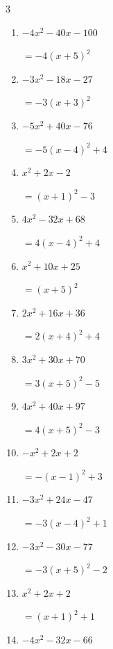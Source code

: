 \begin{multicols}{3}
\begin{enumerate}
\columnbreak %

\resetques

  \item $-4x^{2}-40x-100$

        $=-4\left( x+5\right)^{2}$

  \item $-3x^{2}-18x-27$

        $=-3\left( x+3\right)^{2}$

  \item $-5x^{2}+40x-76$

        $=-5\left( x-4\right)^{2}+4$

  \item $x^{2}+2x-2$

        $=\left( x+1\right)^{2}-3$

  \item $4x^{2}-32x+68$

        $=4\left( x-4\right)^{2}+4$

  \item $x^{2}+10x+25$

        $=\left( x+5\right)^{2}$

  \item $2x^{2}+16x+36$

        $=2\left( x+4\right)^{2}+4$

  \item $3x^{2}+30x+70$

        $=3\left( x+5\right)^{2}-5$

  \item $4x^{2}+40x+97$

        $=4\left( x+5\right)^{2}-3$

  \item $-x^{2}+2x+2$

        $=-\left( x-1\right)^{2}+3$

\columnbreak %

  \item $-3x^{2}+24x-47$

        $=-3\left( x-4\right)^{2}+1$

  \item $-3x^{2}-30x-77$

        $=-3\left( x+5\right)^{2}-2$

  \item $x^{2}+2x+2$

        $=\left( x+1\right)^{2}+1$

  \item $-4x^{2}-32x-66$


\end{enumerate}
\end{multicols}
